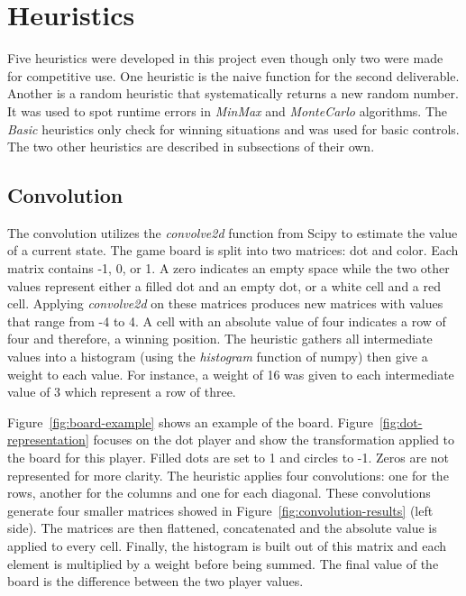 \documentclass[runningheads]{llncs}
\begin{document}
\section{Heuristics}
Five heuristics were developed in this project
even though only two were made for competitive
use. One heuristic is the naive function for the
second deliverable. Another is a random heuristic
that systematically returns a new random number. It
was used to spot runtime errors in \textit{MinMax} and
\textit{MonteCarlo} algorithms. The \textit{Basic}
heuristics only check for winning situations and
was used for basic controls.
The two other heuristics are described in
subsections of their own.

\subsection{Convolution}
The convolution utilizes the \textit{convolve2d} function
from Scipy to estimate the value of a current
state.
The game board is split into two matrices: dot and
color. Each matrix contains -1, 0, or 1. A zero
indicates an empty space while the two other values
represent either a filled dot and an empty dot, or
a white cell and a red cell.
Applying \textit{convolve2d} on these matrices
produces new matrices with values that range from
-4 to 4. A cell with an absolute value of four indicates a row
of four and therefore, a winning position.
The heuristic gathers all intermediate values into
a histogram (using the \textit{histogram}
function of numpy) then give a weight to each
value. For instance, a weight of 16 was given to
each intermediate value of 3 which represent a row
of three.

Figure~\ref{fig:board-example} shows an example of
the board. Figure~\ref{fig:dot-representation}
focuses on the dot player and show the
transformation applied to the board for this
player. Filled dots are set to 1 and circles to
-1. Zeros are not represented for more clarity.
The heuristic applies four convolutions: one for
the rows, another for the columns and one for each
diagonal. These convolutions generate four smaller
matrices showed in
Figure~\ref{fig:convolution-results} (left side).
The matrices are then flattened, concatenated and the
absolute value is applied to every cell. Finally,
the histogram is built out of this matrix and each
element is multiplied by a weight before being
summed.  The final
value of the board is the difference between the
two player values.
\end{document}
